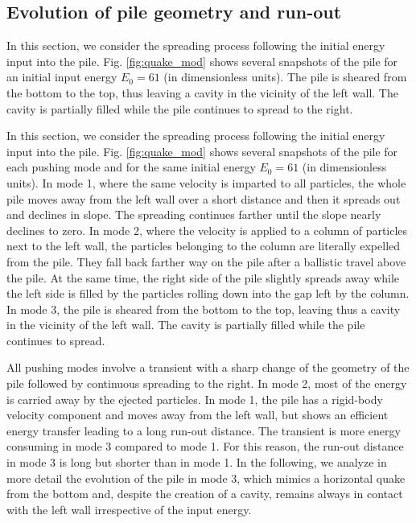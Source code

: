 \subsection{Evolution of pile geometry and run-out}
\label{sec:evolution}

In this section, we consider the spreading process following the initial energy 
input into the pile. Fig. \ref{fig:quake_mod} shows several snapshots of the 
pile for an initial input energy $E_0 = 61$ (in dimensionless units).
The pile is sheared from the bottom to the top, thus leaving a cavity in the 
vicinity of the left wall. The cavity is partially filled while the pile 
continues to spread to the right. 


In this section, we consider the spreading process 
following the initial energy input into the pile. 
Fig. \ref{fig:quake_mod} shows several snapshots of the pile 
for each pushing mode and for the same initial 
energy $E_0 = 61$ (in dimensionless units). 
In mode 1, where the same velocity is imparted to 
all particles, the whole pile moves away  from 
the left wall over a short distance and then it 
spreads out and declines in slope. 
 The spreading continues farther until the slope nearly 
declines to zero. In mode 2, where the velocity is applied to 
a  column of particles next to the left wall, the particles belonging to 
the column are literally expelled from the pile. They fall back farther way on 
the pile after 
a ballistic travel above the pile. At the same time, the right side of the 
pile slightly spreads away  
while the left side is filled by the particles rolling down into the gap 
left by the column. In mode 3, the pile is  
sheared from the bottom to the top, leaving thus a cavity in the 
vicinity of the left wall. The cavity is partially filled while the pile 
continues to spread. 

All pushing modes involve a transient with a sharp change 
of the geometry of the pile followed by continuous spreading to the right. 
In mode 2, most of the energy is carried away by the ejected particles. 
In mode 1, the pile has a rigid-body velocity component and moves 
away from the left wall, but shows an efficient energy transfer leading to a 
long run-out distance.      
The transient is more energy consuming in  mode 3  compared to 
mode 1. For this reason, the run-out distance in mode 3 is long but shorter 
than in mode 1. In the following, we analyze in more detail 
the evolution of the pile in mode 3, which mimics a  
horizontal quake from the bottom and, despite the creation of a cavity, 
remains always in contact with the left wall irrespective of the input 
energy.   


